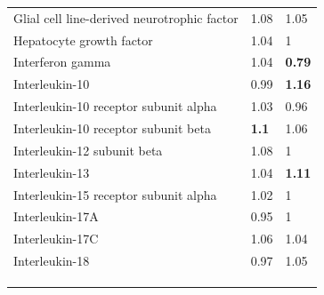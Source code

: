 \begin{table}[ht]
\begin{tabular}{lll}
\rowcolor[HTML]{EFEFEF} 
Glial cell line-derived neurotrophic factor                   & {\color[HTML]{C0C0C0} 1.08}          & {\color[HTML]{C0C0C0} 1.05}          \\
\rowcolor[HTML]{EFEFEF} 
Hepatocyte growth factor                                      & {\color[HTML]{C0C0C0} 1.04}          & {\color[HTML]{C0C0C0} 1}             \\
\rowcolor[HTML]{EFEFEF} 
Interferon gamma                                              & {\color[HTML]{C0C0C0} 1.04}          & {\color[HTML]{CB0000} \textbf{0.79}} \\
\rowcolor[HTML]{EFEFEF} 
Interleukin-10                                                & {\color[HTML]{C0C0C0} 0.99}          & {\color[HTML]{009901} \textbf{1.16}} \\
Interleukin-10 receptor subunit alpha                         & {\color[HTML]{C0C0C0} 1.03}          & {\color[HTML]{C0C0C0} 0.96}          \\
Interleukin-10 receptor subunit beta                          & {\color[HTML]{009901} \textbf{1.1}}  & {\color[HTML]{C0C0C0} 1.06}          \\
Interleukin-12 subunit beta                                   & {\color[HTML]{C0C0C0} 1.08}          & {\color[HTML]{C0C0C0} 1}             \\
Interleukin-13                                                & {\color[HTML]{C0C0C0} 1.04}          & {\color[HTML]{009901} \textbf{1.11}} \\
\rowcolor[HTML]{EFEFEF} 
Interleukin-15 receptor subunit alpha                         & {\color[HTML]{C0C0C0} 1.02}          & {\color[HTML]{C0C0C0} 1}             \\
\rowcolor[HTML]{EFEFEF} 
Interleukin-17A                                               & {\color[HTML]{C0C0C0} 0.95}          & {\color[HTML]{C0C0C0} 1}             \\
\rowcolor[HTML]{EFEFEF} 
Interleukin-17C                                               & {\color[HTML]{C0C0C0} 1.06}          & {\color[HTML]{C0C0C0} 1.04}          \\
\rowcolor[HTML]{EFEFEF} 
Interleukin-18                                                & {\color[HTML]{C0C0C0} 0.97}          & {\color[HTML]{C0C0C0} 1.05}          \\
                                                              &                                      &                                      \\
                                                              &                                      &                                      \\
                                                              &                                      &                                     
\end{tabular}
\label{table:Result1Friends2}
\end{table}


